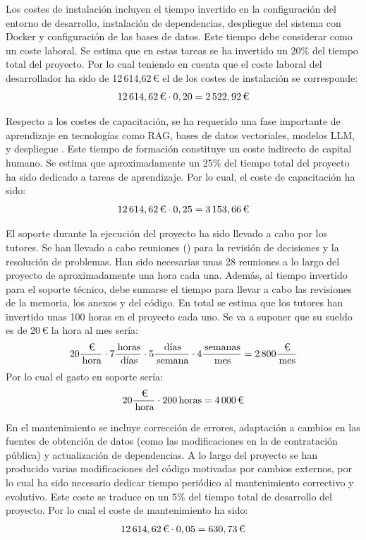 Los costes de instalación incluyen el tiempo invertido en la configuración del entorno de desarrollo, instalación de dependencias, despliegue del sistema con Docker y configuración de las bases de datos. Este tiempo debe considerar como un coste laboral. Se estima que en estas tareas se ha invertido un 20\% del tiempo total del proyecto. Por lo cual teniendo en cuenta que el coste laboral del desarrollador ha sido de 12\,614,62\,€ el de los costes de instalación se corresponde:
$$
12\,614,62\,\text{\texteuro} \cdot 0,20
= 2\,522,92\,\text{\texteuro}
$$

Respecto a los costes de capacitación, se ha requerido una fase importante de aprendizaje en tecnologías como RAG, bases de datos vectoriales, modelos LLM,  y despliegue . Este tiempo de formación constituye un coste indirecto de capital humano. Se estima que aproximadamente un 25\% del tiempo total del proyecto ha sido dedicado a tareas de aprendizaje. Por lo cual, el coste de capacitación ha sido:
$$
12\,614,62\,\text{\texteuro} \cdot 0,25
= 3\,153,66\,\text{\texteuro}
$$

El soporte durante la ejecución del proyecto ha sido llevado a cabo por los tutores. Se han llevado a cabo reuniones () para la revisión de decisiones y la resolución de problemas. Han sido necesarias unas 28 reuniones a lo largo del proyecto de aproximadamente una hora cada una. Además, al tiempo invertido para el soporte técnico, debe sumarse el tiempo para llevar a cabo las revisiones de la memoria, los anexos y del código. En total se estima que los tutores han invertido unas 100 horas en el proyecto cada uno. Se va a suponer que su sueldo es de 20\,€ la hora al mes sería:
$$ 
20\frac{\,\text{\texteuro}}{\,\text{hora}} \cdot 7\frac{\,\text{horas}}{\,\text{días}} \cdot 5\frac{\,\text{días}}{\,\text{semana}} \cdot 4\frac{\,\text{semanas}}{\,\text{mes}} 
= 2\,800\frac{\,\text{\texteuro}}{\,\text{mes}}
$$
Por lo cual el gasto en soporte sería:
$$ 
20\frac{\,\text{\texteuro}}{\,\text{hora}} \cdot 200\,\text{horas}
= 4\,000\,\text{\texteuro}
$$

En el mantenimiento se incluye corrección de errores, adaptación a cambios en las fuentes de obtención de datos (como las modificaciones en la  de contratación pública) y actualización de dependencias. A lo largo del proyecto se han producido varias modificaciones del código motivadas por cambios externos, por lo cual ha sido necesario dedicar tiempo periódico al mantenimiento correctivo y evolutivo. Este coste se traduce en un 5\% del tiempo total de desarrollo del proyecto. Por lo cual el coste de mantenimiento ha sido:
$$
12\,614,62\,\text{\texteuro} \cdot 0,05
= 630,73\,\text{\texteuro}
$$

